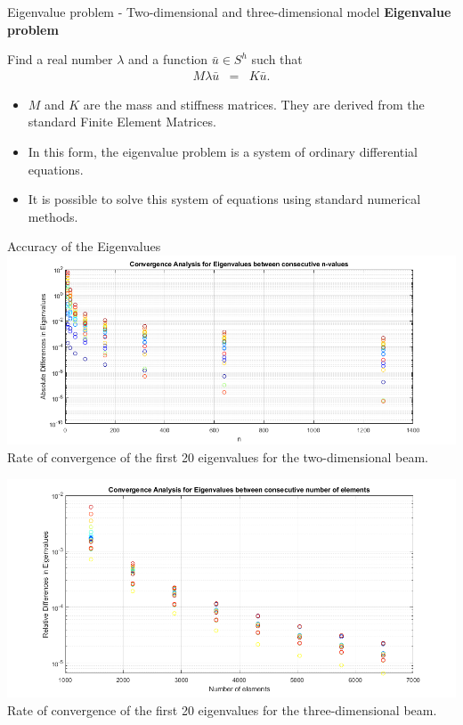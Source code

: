 \documentclass[8pt]{beamer}
\begin{document}
        \begin{frame}{Eigenvalue problem - Two-dimensional and three-dimensional model}
            \textbf{Eigenvalue problem}
            
            Find a real number $\lambda$ and a function $\bar{u} \in S^h$ such that
            \begin{eqnarray}
                M\lambda{\bar{u}} & = & K\bar{u}.
            \end{eqnarray}

            \begin{itemize}
                \item $M$ and $K$ are the mass and stiffness matrices. They are derived from the standard Finite Element Matrices.
                \item In this form, the eigenvalue problem is a system of ordinary differential equations.
                \item It is possible to solve this system of equations using standard numerical methods.
            \end{itemize}
        
        \end{frame}

        \begin{frame}{Accuracy of the Eigenvalues}
            \centering
            \includegraphics[scale=0.3]{Convergence.png} \\ %
            \footnotesize Rate of convergence of the first 20 eigenvalues for the two-dimensional beam.

            \centering
            \includegraphics[scale=0.3]{convergence3d.png} \\ %
            \footnotesize Rate of convergence of the first 20 eigenvalues for the three-dimensional beam.
        \end{frame}
\end{document}
